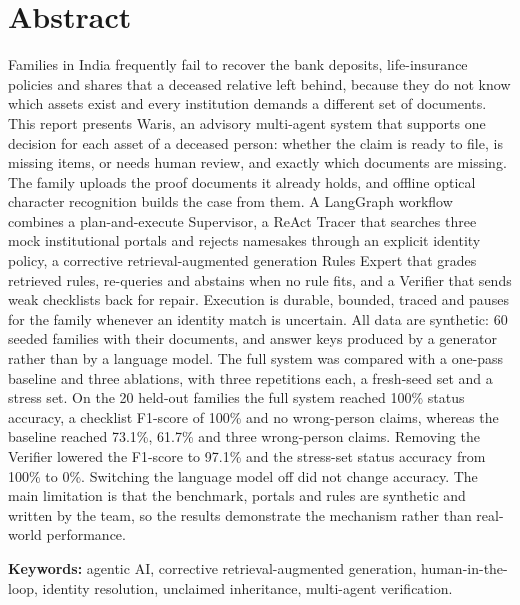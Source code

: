 \chapter*{Abstract}
\thispagestyle{frontmatter}
Families in India frequently fail to recover the bank deposits, life-insurance policies and shares that a deceased relative left behind, because they do not know which assets exist and every institution demands a different set of documents. This report presents Waris, an advisory multi-agent system that supports one decision for each asset of a deceased person: whether the claim is ready to file, is missing items, or needs human review, and exactly which documents are missing. The family uploads the proof documents it already holds, and offline optical character recognition builds the case from them. A LangGraph workflow combines a plan-and-execute Supervisor, a ReAct Tracer that searches three mock institutional portals and rejects namesakes through an explicit identity policy, a corrective retrieval-augmented generation Rules Expert that grades retrieved rules, re-queries and abstains when no rule fits, and a Verifier that sends weak checklists back for repair. Execution is durable, bounded, traced and pauses for the family whenever an identity match is uncertain. All data are synthetic: 60 seeded families with their documents, and answer keys produced by a generator rather than by a language model. The full system was compared with a one-pass baseline and three ablations, with three repetitions each, a fresh-seed set and a stress set. On the 20 held-out families the full system reached 100\% status accuracy, a checklist F1-score of 100\% and no wrong-person claims, whereas the baseline reached 73.1\%, 61.7\% and three wrong-person claims. Removing the Verifier lowered the F1-score to 97.1\% and the stress-set status accuracy from 100\% to 0\%. Switching the language model off did not change accuracy. The main limitation is that the benchmark, portals and rules are synthetic and written by the team, so the results demonstrate the mechanism rather than real-world performance.

\medskip
\noindent\textbf{Keywords:} agentic AI, corrective retrieval-augmented generation, human-in-the-loop, identity resolution, unclaimed inheritance, multi-agent verification.

\tableofcontents
\clearpage{}
\listoffigures
\clearpage{}
\listoftables

